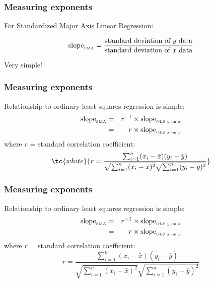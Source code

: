 \begin{frame}
  \frametitle{Measuring exponents}

For Standardized Major Axis Linear Regression:

$$
\mbox{slope}_{\mbox{\tiny SMA}}
=
\frac{
\mbox{standard deviation of $y$ data}
}
{
\mbox{standard deviation of $x$ data}
}
$$

Very simple!

\end{frame}

\begin{frame}
  \frametitle{Measuring exponents}

Relationship to ordinary least squares regression is simple:
\begin{eqnarray*}
\mbox{slope}_{\mbox{\tiny SMA}} & = & r^{-1} \times 
\mbox{slope}_{\mbox{\tiny OLS $y$ on $x$}} \\ 
& = & r \times \mbox{slope}_{\mbox{\tiny OLS $x$ on $y$}}
\end{eqnarray*} \inv
where $r$ = standard correlation coefficient:
$$\tc{white}{
r = \frac{
  \sum_{i=1}^{n} (x_i - \bar{x})(y_i - \bar{y})
}
{
  \sqrt{\sum_{i=1}^{n} (x_i - \bar{x})^2}
  \sqrt{\sum_{i=1}^{n} (y_i - \bar{y})^2}
}
}
$$
\vis

\end{frame}

\begin{frame}
  \frametitle{Measuring exponents}

Relationship to ordinary least squares regression is simple:
\begin{eqnarray*}
\mbox{slope}_{\mbox{\tiny SMA}} & = & r^{-1} \times 
\mbox{slope}_{\mbox{\tiny OLS $y$ on $x$}} \\ 
& = & r \times \mbox{slope}_{\mbox{\tiny OLS $x$ on $y$}}
\end{eqnarray*}
where $r$ = standard correlation coefficient:
$$
r = \frac{
  \sum_{i=1}^{n} (x_i - \bar{x})(y_i - \bar{y})
}
{
  \sqrt{\sum_{i=1}^{n} (x_i - \bar{x})^2}
  \sqrt{\sum_{i=1}^{n} (y_i - \bar{y})^2}
}
$$





\end{frame}

